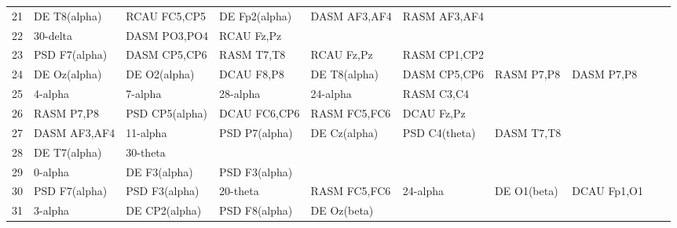 \begin{landscape}
\begin{table}[]
\begin{tabular}{l|llllllll}
21       & DE T8(alpha)   & RCAU FC5,CP5   & DE Fp2(alpha)  & DASM AF3,AF4   & RASM AF3,AF4   &                &               &                &               &               \\
22       & 30-delta       & DASM PO3,PO4   & RCAU Fz,Pz     &                &                &                &               &                &               &               \\
23       & PSD F7(alpha)  & DASM CP5,CP6   & RASM T7,T8     & RCAU Fz,Pz     & RASM CP1,CP2   &                &               &                &               &               \\
24       & DE Oz(alpha)   & DE O2(alpha)   & DCAU F8,P8     & DE T8(alpha)   & DASM CP5,CP6   & RASM P7,P8     & DASM P7,P8    &                &               &               \\
25       & 4-alpha        & 7-alpha        & 28-alpha       & 24-alpha       & RASM C3,C4     &                &               &                &               &               \\
26       & RASM P7,P8     & PSD CP5(alpha) & DCAU FC6,CP6   & RASM FC5,FC6   & DCAU Fz,Pz     &                &               &                &               &               \\
27       & DASM AF3,AF4   & 11-alpha       & PSD P7(alpha)  & DE Cz(alpha)   & PSD C4(theta)  & DASM T7,T8     &               &                &               &               \\
28       & DE T7(alpha)   & 30-theta       &                &                &                &                &               &                &               &               \\
29       & 0-alpha        & DE F3(alpha)   & PSD F3(alpha)  &                &                &                &               &                &               &               \\
30       & PSD F7(alpha)  & PSD F3(alpha)  & 20-theta       & RASM FC5,FC6   & 24-alpha       & DE O1(beta)    & DCAU Fp1,O1   &                &               &               \\
31       & 3-alpha        & DE CP2(alpha)  & PSD F8(alpha)  & DE Oz(beta)    &                &                &               &                &               &               \\
\end{tabular}
\end{table}
\end{landscape}
\clearpage
